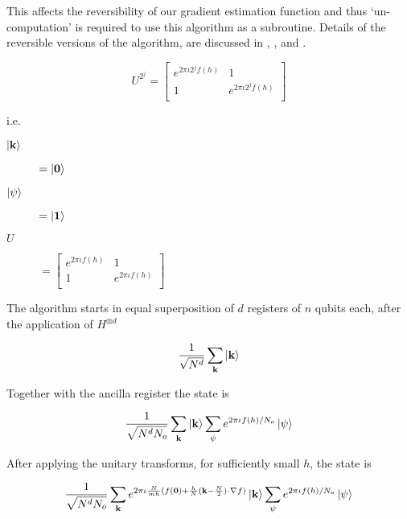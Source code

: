 \documentclass{article}
\begin{document}
This affects the reversibility of our gradient estimation function and thus `un-computation' is required
to use this algorithm as a subroutine. Details of the reversible versions of the algorithm, are discussed in
\cite{quant-ph/0405146}, \cite{1711.00465}, \cite{quant-ph/0507109} and \cite{0908.1921}.


\[
  U^{2^j} =
  \begin{bmatrix}
    e^{2 \pi \iota 2^j f(h)} & 1                        \\
    1                        & e^{2 \pi \iota 2^j f(h)} \\
  \end{bmatrix}
\]


\noindent i.e.
\begin{description}
  \item[\(\ket{\mathbf{k}}\)] \(= \ket{\mathbf{0}}\)
  \item[\(\ket{\psi}\)] \(= \ket{\mathbf{1}}\)
  \item[\(U\)] \(=\begin{bmatrix}
      e^{2 \pi \iota f(h)} & 1                    \\
      1                    & e^{2 \pi \iota f(h)} \\
    \end{bmatrix}\)
\end{description}

The algorithm starts in equal superposition of \(d\) registers of \(n\) qubits each, after
the application of \(H^{\otimes d}\)

\begin{equation}
  \frac{1}{\sqrt{N^d}} \sum_{\mathbf{k}} \ket{\mathbf{k}}
\end{equation}

Together with the ancilla register the state is

\begin{equation}
  \frac{1}{\sqrt{N^d N_o}} \sum_{\mathbf{k}} \ket{\mathbf{k}}
  \sum_{\psi} e^{2 \pi \iota f(h) / N_o} \ket{\psi}
\end{equation}

After applying the unitary transforms, for sufficiently small \(h\), the state is

\begin{equation}
  \frac{1}{\sqrt{N^d N_o}} \sum_{\mathbf{k}}
  e^{2 \pi \iota \frac{N}{m h}(f(\mathbf{0}) + \frac{h}{N}(\mathbf{k} - \frac{N}{2}) \cdot \nabla f)}
  \ket{\mathbf{k}}
  \sum_{\psi} e^{2 \pi \iota f(h) / N_o} \ket{\psi}
\end{equation}
\end{document}

